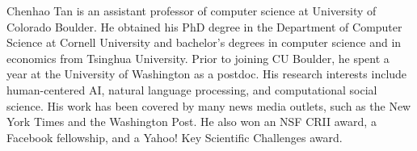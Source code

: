 



Chenhao Tan is an assistant professor of computer science at University of Colorado Boulder. He obtained his PhD degree in the Department of Computer Science at Cornell University and bachelor's degrees in computer science and in economics from Tsinghua University. Prior to joining CU Boulder, he spent a year at the University of Washington as a postdoc. His research interests include human-centered AI, natural language processing, and computational social science. 
His work has been covered by many news media outlets, such as the New York Times and the Washington Post. He also won an NSF CRII award, a Facebook fellowship, and a Yahoo! Key Scientific Challenges award. 




